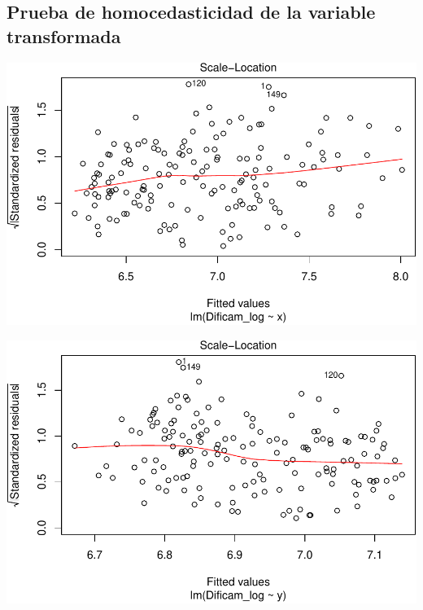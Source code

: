 \documentclass[11pt,]{article}
\newenvironment{Shaded}{\begin{snugshade}}{\end{snugshade}}
\newcommand{\KeywordTok}[1]{\textcolor[rgb]{0.13,0.29,0.53}{\textbf{#1}}}
\newcommand{\DecValTok}[1]{\textcolor[rgb]{0.00,0.00,0.81}{#1}}
\newcommand{\StringTok}[1]{\textcolor[rgb]{0.31,0.60,0.02}{#1}}
\newcommand{\OperatorTok}[1]{\textcolor[rgb]{0.81,0.36,0.00}{\textbf{#1}}}
\newcommand{\NormalTok}[1]{#1}
\begin{document}
\subsection{Prueba de homocedasticidad de la variable
transformada}\label{prueba-de-homocedasticidad-de-la-variable-transformada}

\begin{Shaded}
\end{Shaded}

\includegraphics[width=1\linewidth]{img/unnamed-chunk-8-1}

\begin{Shaded}
\end{Shaded}

\includegraphics[width=1\linewidth]{img/unnamed-chunk-8-2}
\end{document}
